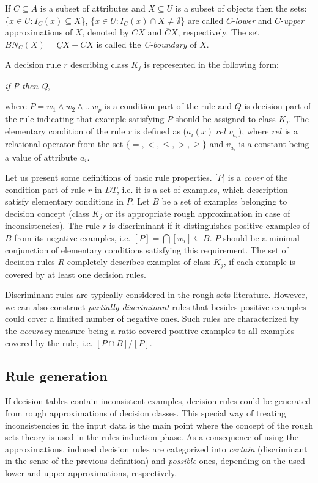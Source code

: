 \documentclass{llncs}
\begin{document}
If $C \subseteq A$  is a subset of attributes and $X \subseteq U$ is a
subset of objects then  the sets: \{$x \in U : I_{C}(x) \subseteq X$\}, \{$x
\in U : I_{C}(x) \cap X \neq \emptyset$\} are called $C$-{\em lower} and
$C$-{\em upper} approximations of $X$, denoted by $\underline{C}X$ and
$\overline{C}X$, respectively. The set $BN_{C}(X)=\underline{C}X -
\overline{C}X$ is called the {\em C-boundary} of $X$.


A decision rule $r$ describing class $K_j$ is represented in the following
form:
\begin{center} {\it if P then Q}, \end{center}
where $P = w_1 \wedge
w_2 \wedge \ldots w_p$ is a condition part  of the rule and $Q$ is decision
part of the rule indicating that example satisfying $P$ should be assigned
to class $K_j$. The elementary condition of the rule $r$ is defined as
($a_i(x) \; rel \; v_{a_i}$), where $rel$ is a relational operator from the
set $\{=, <, \leq,
>, \geq\}$ and $v_{a_i}$ is a constant being a value of attribute $a_i$.

Let us present some definitions of basic rule properties. [$P$] is  a {\em
cover} of the condition part of rule $r$ in $DT$, i.e. it is a set of
examples, which description satisfy elementary conditions in $P$. Let $B$ be
a set of examples belonging to decision concept (class $K_j$ or its
appropriate rough approximation in case of inconsistencies). The rule $r$ is
discriminant if it distinguishes positive examples of $B$ from its negative
examples, i.e. $ [P] = \bigcap [w_i] \subseteq B$. $P$ should be a minimal
conjunction of elementary conditions satisfying this requirement. The set of
decision rules $R$ completely describes examples of class $K_j$, if each
example is covered by at least one decision rules.

Discriminant rules are typically considered in the rough sets literature.
However, we can also construct {\em partially discriminant} rules that
besides positive examples could cover a limited number of negative ones.
Such rules are characterized by the {\em accuracy} measure being a ratio
covered positive examples to all examples covered by the rule, i.e. $[P \cap
B]/[P]$.



\subsection{Rule generation}

If decision tables contain inconsistent examples, decision rules could be
generated from rough approximations of decision classes. This special way of
treating inconsistencies in the input data is the main point where the
concept of the rough sets theory is used in the rules induction phase. As a
consequence of using the approximations, induced decision rules
 are categorized into {\em certain} (discriminant in the sense of the previous
 definition) and {\em possible} ones,
 depending on the used lower and upper approximations, respectively.
\end{document}
